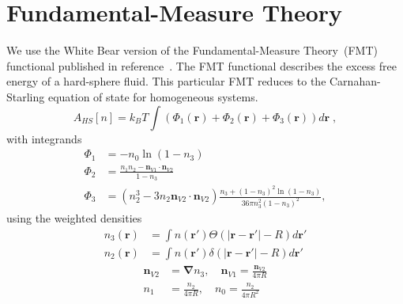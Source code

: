 \documentclass[letterpaper,twocolumn,amsmath,amssymb,jcp,10pt,aip]{revtex4-1}
\newcommand{\rr}{\textbf{r}}
\begin{document}
\section{Fundamental-Measure Theory}

We use the White Bear version of the Fundamental-Measure Theory~(FMT)
functional published in reference~\cite{roth2002whitebear}.  The FMT
functional describes the excess free energy of a hard-sphere fluid.
This particular FMT reduces to the Carnahan-Starling equation of state
for homogeneous systems.
\begin{equation}
A_\textit{HS}[n] = k_B T \int \left(\Phi_1(\rr) + \Phi_2(\rr) + \Phi_3(\rr)\right) d\rr \; ,
\end{equation}
with integrands
\begin{align}
\Phi_1 &= -n_0 \ln\left( 1 - n_3\right)\\
\Phi_2 &= \frac{n_1 n_2 - \mathbf{n}_{V1} \cdot\mathbf{n}_{V2}}{1-n_3} \\
\Phi_3 &= (n_2^3 - 3 n_2 \mathbf{n}_{V2} \cdot \mathbf{n}_{V2}) \frac{
  n_3 + (1-n_3)^2 \ln(1-n_3)
}{
  36\pi n_3^2\left( 1 - n_3 \right)^2
} ,
\end{align}
using the weighted densities
\begin{align}
  n_3(\rr) &= \int n(\rr') \Theta(\left|\rr - \rr'\right| - R) d\rr' \\
  n_2(\rr) &= \int n(\rr') \delta(\left|\rr - \rr'\right| - R) d\rr'
\end{align}
\begin{align}
  \mathbf{n}_{V2} &= \mathbf{\nabla} n_3 , \quad
  \mathbf{n}_{V1} = \frac{\mathbf{n}_{V2}}{4\pi R} \\
  n_1 &= \frac{n_2}{4\pi R} , \quad
  n_0 = \frac{n_2}{4\pi R^2}
\end{align}

\end{document}
